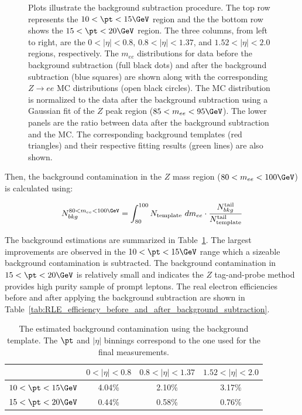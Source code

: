 \begin{figure}[htbp]
\caption{Plots illustrate the background subtraction procedure.
The top row represents the $10<\pt<15 \GeV$ region and the the bottom row shows the $15<\pt<20 \GeV$ region.
The three columns, from left to right, are the $0<|\eta|<0.8$, $0.8<|\eta|<1.37$, and $1.52<|\eta|<2.0$ regions, respectively.
The $m_{ee}$ distributions for data before the background subtraction (full black dots) and after the background subtraction (blue squares) are shown along with the corresponding $Z\to ee$ MC distributions (open black circles).
The MC distribution is normalized to the data after the background subtraction using a Gaussian fit of the $Z$ peak region ($85<m_{ee}<95 \GeV$).
The lower panels are the ratio between data after the background subtraction and the MC.
The corresponding background templates (red triangles) and their respective fitting results (green lines) are also shown.
}
\label{fig:RLE_bkg_estimations}
\end{figure}

Then, the background contamination in the $Z$ mass region ($80<m_{ee}<100 \GeV$) is calculated using:

\begin{equation}
N_{bkg}^{80<m_{ee}<100 \GeV} = \int_{80}^{100} N_{\textrm{template}} \ dm_{ee} \cdot \frac{N_{bkg}^{\textrm{tail}}}{N_{\textrm{template}}^{\textrm{tail}}}
\label{eq:RLE_bkg_in_80_mll_100}
\end{equation}

The background estimations are summarized in Table~\ref{tab:RLE_bkg_estimations}.
The largest improvements are observed in the $10<\pt<15 \GeV$ range which a sizeable background contamination is subtracted.
The background contamination in $15<\pt<20 \GeV$ is relatively small and indicates the $Z$ tag-and-probe method provides high purity sample of prompt leptons.
The real electron efficiencies before and after applying the background subtraction are shown in Table~\ref{tab:RLE_efficiency_before_and_after_background_subtraction}.

\begin{table}[htbp]
\begin{center}
\begin{tabular}{cccc}
\hline
\hline
& $0<|\eta|<0.8$ & $0.8<|\eta|<1.37$ & $1.52<|\eta|<2.0$\\
\hline
$10<\pt<15 \GeV$ & 4.04\% & 2.10\% & 3.17\%\\
$15<\pt<20 \GeV$ & 0.44\% & 0.58\% & 0.76\%\\
\hline
\hline
\end{tabular}
\end{center}
\caption{The estimated background contamination using the background template.
The $\pt$ and $|\eta|$ binnings correspond to the one used for the final measurements.}
\label{tab:RLE_bkg_estimations}
\end{table}

